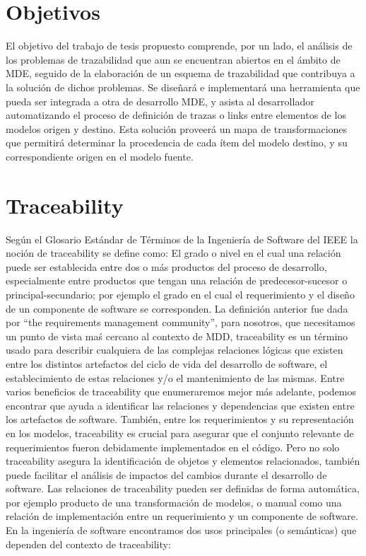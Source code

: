 \documentclass[a4paper,12pt,oneside]{book}
\begin{document}
\chapter{Objetivos}


El objetivo del trabajo de tesis propuesto comprende, por un lado, el análisis de los problemas de trazabilidad que aun se encuentran abiertos en el ámbito de MDE, seguido de la elaboración de un esquema de trazabilidad que contribuya a la solución de dichos problemas.
Se diseñará e implementará una herramienta que pueda ser integrada a otra de desarrollo MDE, y asista al desarrollador automatizando el proceso de definición de trazas o links entre elementos de los modelos origen y destino. Esta solución proveerá un mapa de transformaciones que permitirá determinar la procedencia de cada ítem del modelo destino, y su correspondiente origen en el modelo fuente.


\mainmatter
\chapter{Traceability}


Según el Glosario Estándar de Términos de la Ingeniería de Software del IEEE \cite{IEEE} la noción de traceability se define como: El grado o nivel en el cual una relación puede ser establecida entre dos o más productos del proceso de desarrollo, especialmente entre productos que tengan una relación de predecesor-sucesor o principal-secundario; por ejemplo el grado en el cual el requerimiento y el diseño de un componente de software se corresponden. La definición anterior fue dada por “the requirements management community”, para nosotros, que necesitamos un punto de vista maś cercano al contexto de MDD, traceability es un término usado para describir cualquiera de las complejas relaciones lógicas que existen entre los distintos artefactos del ciclo de vida del desarrollo de software, el establecimiento de estas relaciones y/o el mantenimiento de las mismas.
Entre varios beneficios de traceability que enumeraremos mejor más adelante, podemos encontrar que ayuda a identificar las relaciones y dependencias que existen entre los artefactos de software. También, entre los requerimientos y su representación en los modelos, traceability es crucial para asegurar que el conjunto relevante de requerimientos fueron debidamente implementados en el código. Pero no solo traceability asegura la identificación de objetos y elementos relacionados, también puede facilitar el análisis de impactos del cambios durante el desarrollo de software.
Las relaciones de traceability pueden ser definidas de forma automática, por ejemplo producto de una transformación de modelos, o manual como una relación de implementación entre un requerimiento y un componente de software.
En la ingeniería de software encontramos dos usos principales (o semánticas) que dependen del contexto de traceability:
\end{document}

